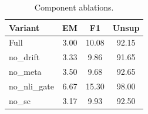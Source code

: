 \begin{table}[t]\centering\small
\begin{tabular}{lccc}
\toprule
Variant & EM & F1 & Unsup \\
\midrule
Full & 3.00 & 10.08 & 92.15 \\
no\_drift & 3.33 & 9.86 & 91.65 \\
no\_meta & 3.50 & 9.68 & 92.65 \\
no\_nli\_gate & 6.67 & 15.30 & 98.00 \\
no\_sc & 3.17 & 9.93 & 92.50 \\
\bottomrule
\end{tabular}
\caption{Component ablations.}
\end{table}
